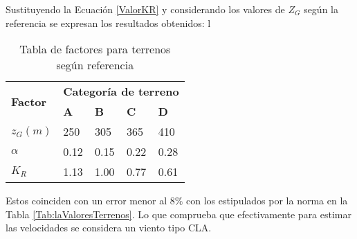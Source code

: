 Sustituyendo la Ecuación \ref{ValorKR}  y considerando los valores de $Z_G$ según la referencia \citep{Oke2000} se expresan los resultados obtenidos: l

\begin{table}[h] 
	\begin{footnotesize} 
		\begin{center} 
			\begin{tabular}{ |p{3cm}|p{2cm}|p{2cm}|p{2cm}|p{2cm}|} \hline
				\multirow{2}{*}{\textbf{Factor}}  & \multicolumn{4}{|c|}{ \textbf{Categoría de terreno} }  \\ 
				& \textbf{A}& \textbf{B} &\textbf{C}&\textbf{D}\\
				\hline
				$z_G(m)$   & 250     &305&  365 &410\\ \hline
				$\alpha$& 0.12  & 0.15 & 0.22 &0.28\\ \hline
				$K_R$ & 1.13 &1.00 &0.77&  0.61\\ \hline
			\end{tabular}
		\end{center} 
		\caption{Tabla de factores para terrenos según referencia \cite{Davenport1960} }
	\end{footnotesize} 
	\label{TablaValoresTerrenos} 
\end{table}
Estos coinciden con un error menor al $8\%$ con los estipulados por la norma en la Tabla \ref{Tab:laValoresTerrenos}. Lo que comprueba que efectivamente para estimar las velocidades se considera un viento tipo CLA. 

